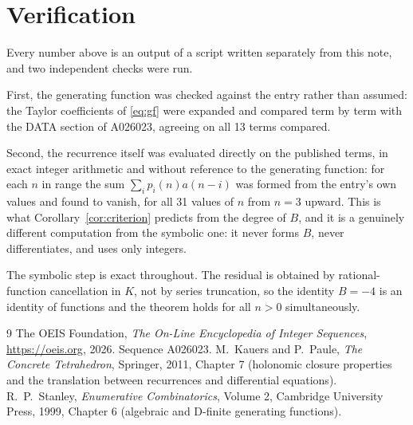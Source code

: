 \documentclass[11pt,a4paper]{article}
\theoremstyle{plain}
\theoremstyle{definition}
\begin{document}
\section{Verification}

Every number above is an output of a script written separately from this note, and two
independent checks were run.

First, the generating function was checked against the entry rather than assumed: the
Taylor coefficients of \eqref{eq:gf} were expanded and compared term by term with the DATA
section of A026023, agreeing on all 13 terms compared.

Second, the recurrence itself was evaluated directly on the published terms, in exact
integer arithmetic and without reference to the generating function: for each $n$ in range
the sum $\sum_{i}p_{i}(n)a(n-i)$ was formed from the entry's own values and found to
vanish, for all 31 values of $n$ from $n=3$ upward. This is what
Corollary~\ref{cor:criterion} predicts from the degree of $B$, and it is a genuinely
different computation from the symbolic one: it never forms $B$, never differentiates, and
uses only integers.

The symbolic step is exact throughout. The residual is obtained by rational-function
cancellation in $K$, not by series truncation, so the identity $B=-4$ is an
identity of functions and the theorem holds for all $n>0$ simultaneously.

\begin{thebibliography}{9}
 The OEIS Foundation, \emph{The On-Line Encyclopedia of Integer Sequences},
\url{https://oeis.org}, 2026. Sequence A026023.
 M.~Kauers and P.~Paule, \emph{The Concrete Tetrahedron}, Springer, 2011,
Chapter 7 (holonomic closure properties and the translation between recurrences and
differential equations).
 R.~P.~Stanley, \emph{Enumerative Combinatorics}, Volume 2, Cambridge
University Press, 1999, Chapter 6 (algebraic and D-finite generating functions).
\end{thebibliography}
\end{document}
